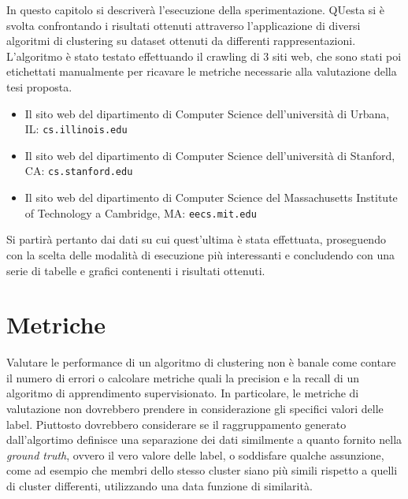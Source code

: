 

In questo capitolo si descriverà l'esecuzione della sperimentazione. QUesta si è svolta confrontando i risultati ottenuti attraverso l'applicazione di diversi algoritmi di clustering su dataset ottenuti da differenti rappresentazioni. L'algoritmo è stato testato effettuando il crawling di $3$ siti web, che sono stati poi etichettati manualmente per ricavare le metriche necessarie alla valutazione della tesi proposta.
\begin{itemize}
\item Il sito web del dipartimento di Computer Science dell'università di Urbana, IL: \texttt{cs.illinois.edu}
\item Il sito web del dipartimento di Computer Science dell'università di Stanford, CA: \texttt{cs.stanford.edu}
\item Il sito web del dipartimento di Computer Science del  Massachusetts Institute of Technology a Cambridge, MA: \texttt{eecs.mit.edu}
\end{itemize}
Si partirà pertanto dai dati su cui quest'ultima è stata effettuata, proseguendo con la scelta delle modalità di esecuzione più interessanti e concludendo con una serie di tabelle e grafici contenenti i risultati ottenuti. 


\section{Metriche}
Valutare le performance di un algoritmo di clustering non è banale come contare il numero di errori o calcolare metriche quali la precision e la recall di un algoritmo di apprendimento supervisionato. In particolare, le metriche di valutazione non dovrebbero prendere in considerazione gli specifici valori delle label. Piuttosto dovrebbero considerare se il raggruppamento generato dall'algortimo definisce una separazione dei dati similmente a quanto fornito nella \textit{ground truth}, ovvero il vero valore delle label, o soddisfare qualche assunzione, come ad esempio che membri dello stesso cluster siano più simili rispetto a quelli di cluster differenti, utilizzando una data funzione di similarità.

